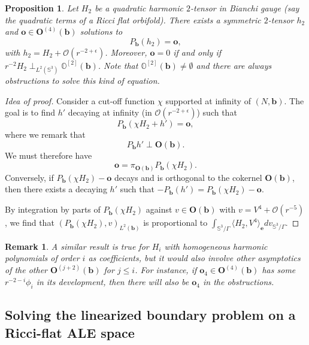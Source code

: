 \documentclass[12pt]{article}
\newtheorem{prop}[thm]{Proposition}
\newtheorem{rem}[thm]{Remark}
\begin{document}
   \begin{prop}\label{resolutino modulo obst linear}
        Let $H_2$ be a quadratic harmonic $2$-tensor in Bianchi gauge (say the quadratic terms of a Ricci flat orbifold). There exists a symmetric $2$-tensor $h_2$ and $\mathbf{o}\in \mathbf{O}^{(4)}(\mathbf{b})$ solutions to
        $$ P_\mathbf{b}(h_2) = \mathbf{o}, $$
        with $h_2 = H_2 + \mathcal{O}(r^{-2+\epsilon})$. Moreover, $\mathbf{o} = 0$ if and only if $ r^{-2}H_2 \perp_{L^2(\mathbb{S}^3)}  \mathbb{O}^{[2]}(\mathbf{b}) $. Note that $\mathbb{O}^{[2]}(\mathbf{b})\neq \emptyset$ and there are \emph{always} obstructions to solve this kind of equation.
   \end{prop}
   \begin{proof}[Idea of proof]
        Consider a cut-off function $\chi$ supported at infinity of $(N,\mathbf{b})$. The goal is to find $h'$ decaying at infinity (in $\mathcal{O}(r^{-2+\epsilon})$) such that 
        $$ P_\mathbf{b}(\chi H_2 + h') = \mathbf{o}, $$
        where we remark that 
        $$ P_{\mathbf{b}}h'\perp \mathbf{O}(\mathbf{b}). $$
        We must therefore have 
        $$\mathbf{o} = \pi_{\mathbf{O}(\mathbf{b})}P_\mathbf{b}(\chi H_2).$$
        Conversely, if $P_\mathbf{b}(\chi H_2)-\mathbf{o}$ decays and is orthogonal to the cokernel $\mathbf{O}(\mathbf{b})$, then there exists a decaying $h'$ such that $-P_\mathbf{b}(h') = P_\mathbf{b}(\chi H_2)-\mathbf{o}$.
        
        By integration by parts of $P_\mathbf{b}(\chi H_2)$ against $v\in\mathbf{O}(\mathbf{b})$ with $v = V^4 + \mathcal{O}(r^{-5})$, we find that
        $\left(P_\mathbf{b}(\chi H_2),v\right)_{L^2(\mathbf{b})}$ is proportional to $\int_{\mathbb{S}^3\slash\Gamma} \langle H_2,V^4 \rangle_{\mathbf{e}} dv_{\mathbb{S}^3\slash\Gamma}$.
   \end{proof}
   
   \begin{rem}
        A similar result is true for $H_i$ with homogeneous harmonic polynomials of order $i$ as coefficients, but it would also involve other asymptotics of the other $\mathbf{O}^{(j+2)}(\mathbf{b})$ for $j\leqslant i$. For instance, if $\mathbf{o}_4 \in \mathbf{O}^{(4)}(\mathbf{b})$ has some $r^{-2-i} \phi_i$ in its development, then there will also be $\mathbf{o}_4$ in the obstructions.
   \end{rem}
   
   \subsection{Solving the linearized boundary problem on a Ricci-flat ALE space}
   
\end{document}
